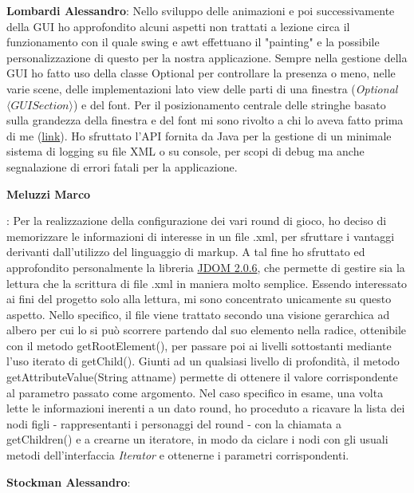 \documentclass[a4paper,12pt, hidelinks]{report}
\begin{document}
	\item \textbf{Lombardi Alessandro}: Nello sviluppo delle animazioni e poi successivamente della GUI ho approfondito alcuni aspetti non trattati a lezione circa il funzionamento con il quale swing e awt effettuano il "painting" e la possibile personalizzazione di questo per la nostra applicazione. Sempre nella gestione della GUI ho fatto uso della classe Optional per controllare la presenza o meno, nelle varie scene, delle implementazioni lato view delle parti di una finestra (\emph{Optional$\langle GUISection \rangle$}) e del font. Per il posizionamento centrale delle stringhe basato sulla grandezza della finestra e del font mi sono rivolto a chi lo aveva fatto prima di me (\href{https://stackoverflow.com/questions/27706197/how-can-i-center-graphics-drawstring-in-java}{link}). Ho sfruttato l'API fornita da Java per la gestione di un minimale sistema di logging su file XML o su console, per scopi di debug ma anche segnalazione di errori  fatali per la applicazione.

	\hypertarget{target}{\item \textbf{Meluzzi Marco}}: Per la realizzazione della configurazione dei vari round di gioco, ho deciso di memorizzare le informazioni di interesse in un file .xml, per sfruttare i vantaggi derivanti dall'utilizzo del linguaggio di markup. A tal fine ho sfruttato ed approfondito personalmente la libreria \href{http://www.jdom.org}{JDOM 2.0.6}, che permette di gestire sia la lettura che la scrittura di file .xml in maniera molto semplice. Essendo interessato ai fini del progetto solo alla lettura, mi sono concentrato unicamente su questo aspetto. Nello specifico, il file viene trattato secondo una visione gerarchica ad albero per cui lo si può scorrere partendo dal suo elemento nella radice, ottenibile con il metodo getRootElement(), per passare poi ai livelli sottostanti mediante l'uso iterato di getChild(). Giunti ad un qualsiasi livello di profondità, il metodo getAttributeValue(String attname) permette di ottenere il valore corrispondente al parametro passato come argomento. Nel caso specifico in esame, una volta lette le informazioni inerenti a un dato round, ho proceduto a ricavare la lista dei nodi figli - rappresentanti i personaggi del round - con la chiamata a getChildren() e a crearne un iteratore, in modo da ciclare i nodi con gli usuali metodi dell'interfaccia \emph{Iterator} e ottenerne i parametri corrispondenti.

	\item \textbf{Stockman Alessandro}:
\end{document}
